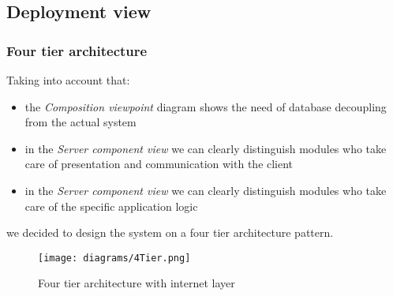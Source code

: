 \clearpage

\subsection{Deployment view}

\subsubsection{Four tier architecture}
Taking into account that:
\begin{itemize}
	\item the \emph{Composition viewpoint} diagram shows the need of database decoupling from the actual system
	\item in the \emph{Server component view} we can clearly distinguish modules who take care of presentation and communication with the client
	\item in the \emph{Server component view} we can clearly distinguish modules who take care of the specific application logic
\end{itemize}
we decided to design the system on a four tier architecture pattern.\newline\newline

\begin{figure}[h!]
	\centering
	\texttt{[image: diagrams/4Tier.png]}
	\caption{
		\label{fig:fourTierCloud} 
		Four tier architecture with internet layer
	}
\end{figure}

